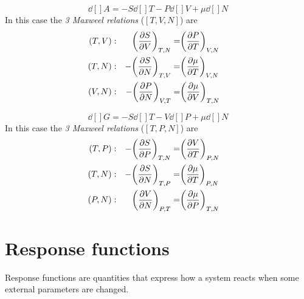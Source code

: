 \documentclass[../main/main.tex]{subfiles}
\begin{document}
\begin{example}[Helmholz \( A=A(T,V,N) \)]
\begin{equation}
  \dd[]{A} = - S \dd[]{T} - P \dd[]{V} + \mu \dd[]{N}
\end{equation}
In this case the \emph{3 Maxweel relations} (\( [T,V,N] \)) are
\begin{subequations}
\begin{align}
  (T,V) &:& \qty(\pdv{S}{V} )_{T,N} =&  \qty(\pdv{P}{T} )_{V,N} & \\
  (T,N) &:& -\qty(\pdv{S}{N} )_{T,V} =& \qty(\pdv{\mu }{T} )_{V,N} &\\
  (V,N) &:& -\qty(\pdv{P}{N} )_{V,T} =& \qty(\pdv{\mu }{V} )_{T,N} &
 \end{align}
\label{}
\end{subequations}
\end{example}
\begin{example}[Gibbs \( G=G(T,P,N) \) ]
  \begin{equation}
    \dd[]{G} = - S \dd[]{T} - V \dd[]{P} + \mu \dd[]{N}
  \end{equation}
  In this case the \emph{3 Maxweel relations} (\( [T,P,N] \)) are
  \begin{subequations}
  \begin{align}
    (T,P) &:& -\qty(\pdv{S}{P} )_{T,N} =&  \qty(\pdv{V}{T} )_{P,N} & \\
    (T,N) &:& -\qty(\pdv{S}{N} )_{T,P} =& \qty(\pdv{\mu }{T} )_{P,N} &\\
    (P,N) &:& \qty(\pdv{V}{N} )_{P,T} =& \qty(\pdv{\mu }{P} )_{T,N} &
   \end{align}
  \label{}
  \end{subequations}
\end{example}

\section{Response functions}
Response functions are quantities that express how a system reacts when some external parameters are changed.
\end{document}
